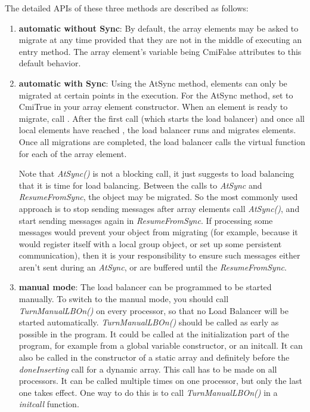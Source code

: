 The detailed APIs of these three methods are described as follows:
\begin{enumerate}

\item {\bf automatic without Sync}: By default, the array elements may be asked to migrate at any time
provided that they are not in the middle of executing an entry method. 
The array element's variable  being CmiFalse attributes
to this default behavior. 

\item {\bf automatic with Sync}: Using the AtSync method, elements can 
only be migrated at certain points in the execution. For the AtSync method, 
set  to CmiTrue in your 
array element constructor.  When an element is ready to migrate,
call .  
After the first  call (which starts the load balancer)
and once all local elements have reached ,
the load balancer runs and migrates elements.  Once
all migrations are completed, the load balancer calls the 
virtual function  for each of the
array element.  

Note that {\em AtSync()} is not a blocking call, it just suggests to load
balancing that it is time for load balancing. Between the calls to
{\em AtSync} and {\em ResumeFromSync}, the object
may be migrated. So the most commonly used approach is to stop sending
messages after array elements call {\em AtSync()}, and start sending
messages again in {\em ResumeFromSync}.
If processing some messages would prevent your object
from migrating (for example, because it would register itself with
a local group object, or set up some persistent communication),
then it is your responsibility to ensure such messages either aren't
sent during an {\em AtSync}, or are buffered until the {\em ResumeFromSync}.

\item {\bf manual mode}: The load balancer can be programmed to be started
manually. To switch to the manual mode, you should call
{\em TurnManualLBOn()} on every processor, so that no Load Balancer will 
be started automatically. {\em TurnManualLBOn()} should be called as 
early as possible in the program. It could be called at the initialization 
part of the program, 
for example from a global variable constructor, or an initcall.
It can also be called in the constructor of a static array and
definitely before the {\em doneInserting} call for a dynamic array.  This call 
has to be made on all processors. It can be called multiple times on one 
processor, but only the last one takes effect. One way to do this is to call
{\em TurnManualLBOn()} in a {\em initcall} function.  


\end{enumerate}
